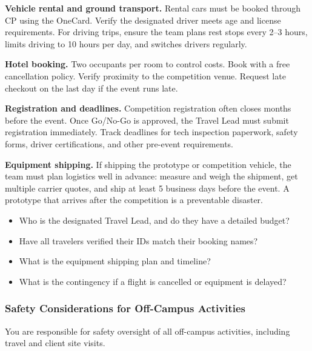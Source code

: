 \textbf{Vehicle rental and ground transport.} Rental cars must be booked through CP using the OneCard. Verify the designated driver meets age and license requirements. For driving trips, ensure the team plans rest stops every 2--3 hours, limits driving to 10 hours per day, and switches drivers regularly.

\textbf{Hotel booking.} Two occupants per room to control costs. Book with a free cancellation policy. Verify proximity to the competition venue. Request late checkout on the last day if the event runs late.

\textbf{Registration and deadlines.} Competition registration often closes months before the event. Once Go/No-Go is approved, the Travel Lead must submit registration immediately. Track deadlines for tech inspection paperwork, safety forms, driver certifications, and other pre-event requirements.

\textbf{Equipment shipping.} If shipping the prototype or competition vehicle, the team must plan logistics well in advance: measure and weigh the shipment, get multiple carrier quotes, and ship at least 5 business days before the event. A prototype that arrives after the competition is a preventable disaster.

\begin{paquestion}
\begin{itemize}[nosep,leftmargin=1.5em]
\item Who is the designated Travel Lead, and do they have a detailed budget?
\item Have all travelers verified their IDs match their booking names?
\item What is the equipment shipping plan and timeline?
\item What is the contingency if a flight is cancelled or equipment is delayed?
\end{itemize}
\end{paquestion}

\subsubsection{Safety Considerations for Off-Campus Activities}

You are responsible for safety oversight of all off-campus activities, including travel and client site visits.

